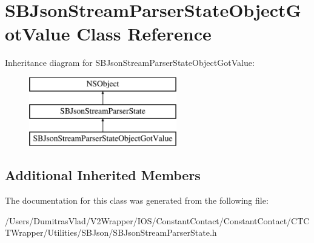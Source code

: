 \hypertarget{interface_s_b_json_stream_parser_state_object_got_value}{\section{S\-B\-Json\-Stream\-Parser\-State\-Object\-Got\-Value Class Reference}
\label{interface_s_b_json_stream_parser_state_object_got_value}
}
Inheritance diagram for S\-B\-Json\-Stream\-Parser\-State\-Object\-Got\-Value\-:\begin{figure}[H]
\begin{center}
\leavevmode
\includegraphics[height=3.000000cm]{interface_s_b_json_stream_parser_state_object_got_value}
\end{center}
\end{figure}
\subsection*{Additional Inherited Members}


The documentation for this class was generated from the following file\-:\begin{DoxyCompactItemize}
\item 
/\-Users/\-Dumitras\-Vlad/\-V2\-Wrapper/\-I\-O\-S/\-Constant\-Contact/\-Constant\-Contact/\-C\-T\-C\-T\-Wrapper/\-Utilities/\-S\-B\-Json/S\-B\-Json\-Stream\-Parser\-State.\-h\end{DoxyCompactItemize}
